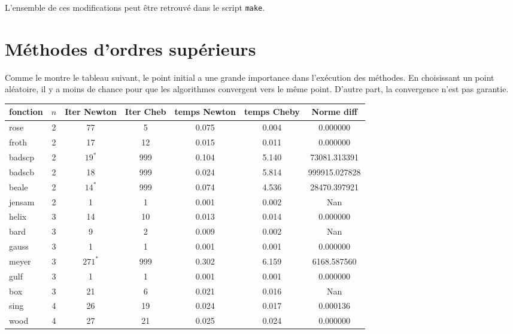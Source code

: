 L'ensemble de ces modifications peut être retrouv\'e dans le script {\tt make}.





\section{M\'ethodes d'ordres sup\'erieurs}

Comme le montre le tableau suivant, le point initial a une grande importance dans l'ex\'ecution des m\'ethodes. 
En choisissant un point al\'eatoire, il y a moins de chance pour que les algorithmes convergent vers le même point. D'autre part,
la convergence n'est pas garantie.

\begin{table}%
	\begin{center}
{\small
\begin{tabular}{|l|c|c|c|c|c|c|}
  \hline fonction & $n$ & Iter Newton & Iter Cheb & temps Newton & temps Cheby & Norme diff \\
 \hline
   rose& 2 & 77 & 5 & 0.075 & 0.004 & 0.000000 \\\hline
   froth& 2 & 17 & 12 & 0.015 & 0.011 & 0.000000 \\\hline
   badscp& 2 & $19^*$ & 999 & 0.104 & 5.140 & 73081.313391 \\\hline
   badscb& 2 & 18 & 999 & 0.024 & 5.814 & 999915.027828 \\\hline
   beale& 2 & $14^*$ & 999 & 0.074 & 4.536 & 28470.397921 \\\hline
   jensam& 2 & 1 & 1 & 0.001 & 0.002 & Nan \\\hline
   helix& 3 & 14 & 10 & 0.013 & 0.014 & 0.000000 \\\hline
   bard& 3 & 9 & 2 & 0.009 & 0.002 & Nan \\\hline
   gauss& 3 & 1 & 1 & 0.001 & 0.001 & 0.000000 \\\hline
   meyer& 3 & $271^*$ & 999 & 0.302 & 6.159 & 6168.587560 \\\hline
   gulf& 3 & 1 & 1 & 0.001 & 0.001 & 0.000000 \\\hline
   box& 3 & 21 & 6 & 0.021 & 0.016 & Nan \\\hline
   sing& 4 & 26 & 19 & 0.024 & 0.017 & 0.000136 \\\hline
   wood& 4 & 27 & 21 & 0.025 & 0.024 & 0.000000 \\\hline

\end{tabular}}
\end{center}
\end{table}
